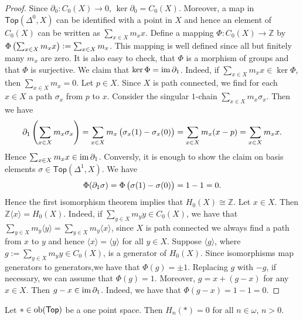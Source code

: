 \begin{proof}
	Since $\partial_0 : C_0(X) \to 0$, $\ker \partial_0 = C_0(X)$. Moreover, a map in $\mathsf{Top}(\Delta^0,X)$ can be identified with a point in $X$ and hence an element of $C_0(X)$ can be written as $\sum_{x \in X}m_x x$. Define a mapping $\Phi : C_0(X) \to \mathbb{Z}$ by $\Phi\del[1]{\sum_{x \in X}m_x x} := \sum_{x \in X}m_x$. This mapping is well defined since all but finitely many $m_x$ are zero. It is also easy to check, that $\Phi$ is a morphism of groups and that $\Phi$ is surjective. We claim that $\ker \Phi = \operatorname{im} \partial_1$. Indeed, if $\sum_{x \in X} m_x x \in \ker \Phi$, then $\sum_{x \in X}m_x = 0$. Let $p \in X$. Since $X$ is path connected, we find for each $x \in X$ a path $\sigma_x$ from $p$ to $x$. Consider the singular $1$-chain $\sum_{x \in X}m_x \sigma_x$. Then we have
	\begin{equation*}
		\partial_1 \del[4]{\sum_{x \in X}m_x \sigma_x} = \sum_{x \in X}m_x \del[1]{\sigma_x(1)- \sigma_x(0)} = \sum_{x \in X}m_x (x - p) = \sum_{x \in X} m_x x.
	\end{equation*}
	Hence $\sum_{x \in X}m_x x \in \operatorname{im} \partial_1$. Conversly, it is enough to show the claim on basis elements $\sigma \in \mathsf{Top}(\Delta^1,X)$. We have
	\begin{equation*}
		\Phi(\partial_1 \sigma) = \Phi\del[1]{\sigma(1) - \sigma(0)} = 1 - 1 = 0.
	\end{equation*}
	Hence the first isomorphism theorem \cite[23]{grillet:abstract_algebra:2007} implies that $H_0(X) \cong \mathbb{Z}$.
	Let $x \in X$. Then $\mathbb{Z}\langle x \rangle = H_0(X)$. Indeed, if $\sum_{y \in X}m_y y \in C_0(X)$, we have that $\sum_{y \in X}m_y \langle y \rangle = \sum_{y \in X}m_y \langle x \rangle$, since $X$ is path connected we always find a path from $x$ to $y$ and hence $\langle x \rangle = \langle y \rangle$ for all $y \in X$. Suppose $\langle g \rangle$, where $g := \sum_{y \in X}m_y y \in C_0(X)$, is a generator of $H_0(X)$. Since isomorphisms map generators to generators,we have that $\Phi(g) = \pm 1$. Replacing $g$ with $-g$, if necessary, we can assume that $\Phi(g) = 1$. Moreover, $g = x + (g - x)$ for any $x \in X$. Then $g - x \in \operatorname{im} \partial_1$. Indeed, we have that $\Phi(g - x) = 1 - 1 = 0$.
\end{proof}

\begin{proposition}
	Let $\ast \in \operatorname{ob}(\mathsf{Top})$ be a one point space. Then $H_n(\ast) = 0$ for all $n \in \omega$, $n > 0$.
\end{proposition}

